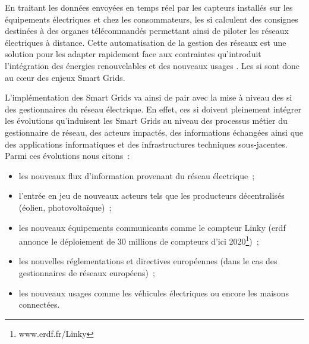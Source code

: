
En traitant les données envoyées en temps réel par les capteurs installés sur 
les équipements électriques et chez les consommateurs, les \gls{si} calculent des 
consignes destinées à des organes télécommandés permettant ainsi de piloter les 
réseaux électriques à distance. 
Cette automatisation de la gestion des réseaux est une solution pour les adapter 
rapidement face aux contraintes qu'introduit l'intégration des énergies 
renouvelables et des nouveaux usages \cite{cre}. Les \gls{si} sont donc au cœur des 
enjeux Smart Grids.  

L'implémentation des Smart Grids va ainsi de pair avec la mise à niveau des \gls{si} 
des gestionnaires du réseau électrique. En effet, ces \gls{si} doivent pleinement 
intégrer les évolutions qu'induisent les Smart Grids au niveau des processus 
métier du gestionnaire de réseau, des acteurs impactés, des informations 
échangées ainsi que des applications informatiques et des infrastructures 
techniques sous-jacentes. Parmi ces évolutions nous citons~:
\begin{itemize}
    \item les nouveaux flux d'information provenant du réseau électrique~;
    \item l'entrée en jeu de nouveaux acteurs tels que les producteurs
    décentralisés (éolien, photovoltaïque)~;
    \item les nouveaux équipements communicants comme le compteur Linky (\gls{erdf} 
    annonce le déploiement de 30 millions de compteurs d'ici 
    2020\footnote{www.erdf.fr/Linky})~;
    \item les nouvelles réglementations et directives européennes (dans le cas 
    des gestionnaires de réseaux européens)~;
    \item les nouveaux usages comme les véhicules électriques ou encore les maisons 
    connectées.
\end{itemize}

